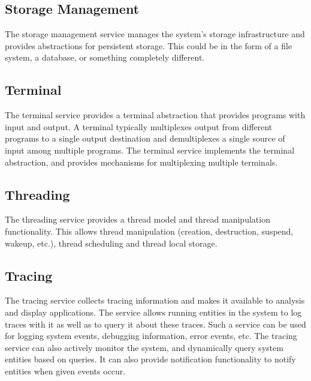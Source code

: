 \documentclass[a4paper,twoside]{report} %
\begin{document}
\subsection{Storage Management}


The storage management service manages the system's storage
infrastructure and provides abstractions for persistent storage.  This
could be in the form of a file system, a database, or something
completely different.

\subsection{Terminal}


The terminal service provides a terminal abstraction that provides
programs with input and output.  A terminal typically multiplexes
output from different programs to a single output destination and
demultiplexes a single source of input among multiple programs.
The terminal service implements the terminal abstraction, and provides
mechanisms for multiplexing multiple terminals.

\subsection{Threading}


The threading service provides a thread model and thread manipulation
functionality. This allows thread manipulation (creation, destruction,
suspend, wakeup, etc.), thread scheduling and thread local storage. 

\subsection{Tracing}


The tracing service collects tracing information and makes it
available to analysis and display applications.  The service allows
running entities in the system to log traces with it as well as to
query it about these traces.  Such a service can be used for logging
system events, debugging information, error events, etc.  The tracing
service can also actively monitor the system, and dynamically query
system entities based on queries.  It can also provide notification
functionality to notify entities when given events occur.
\end{document}
